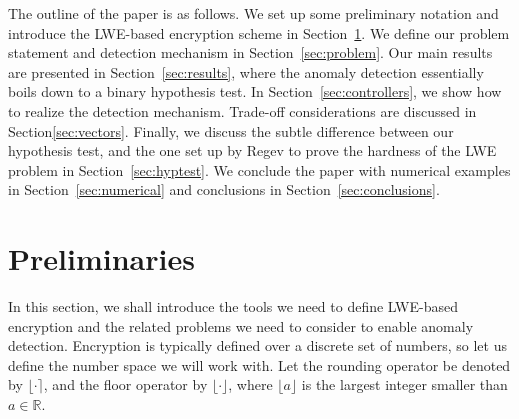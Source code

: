 \documentclass[journal, twoside, web]{ieeecolorpreprint}
\begin{document}
The outline of the paper is as follows. We set up some preliminary notation and introduce the LWE-based encryption scheme in Section~\ref{sec:prelim}. We define our problem statement and detection mechanism in Section~\ref{sec:problem}. Our main results are presented in Section~\ref{sec:results}, where the anomaly detection essentially boils down to a binary hypothesis test. In Section~\ref{sec:controllers}, we show how to realize the detection mechanism. Trade-off considerations are discussed in Section\ref{sec:vectors}. Finally, we discuss the subtle difference between our hypothesis test, and the one set up by Regev to prove the hardness of the LWE problem in Section~\ref{sec:hyptest}. We conclude the paper with numerical examples in Section~\ref{sec:numerical} and conclusions in Section~\ref{sec:conclusions}.





\section{Preliminaries}\label{sec:prelim}
In this section, we shall introduce the tools we need to define LWE-based encryption and the related problems we need to consider to enable anomaly detection. Encryption is typically defined over a discrete set of numbers, so let us define the number space we will work with. Let the rounding operator be denoted by $\lfloor \cdot \rceil$, and the floor operator by $\lfloor \cdot \rfloor$, where $\lfloor a \rfloor$ is the largest integer smaller than $a \in \mathbb R$.
\end{document}
